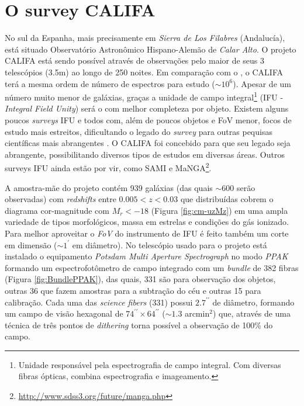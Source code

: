 
\section{O survey CALIFA}
\label{sec:CALePyC:Apresent}

No sul da Espanha, mais precisamente em {\em Sierra de Los Filabres} (Andalucía), está situado Observatório Astronômico
Hispano-Alemão de {\em Calar Alto}. O projeto CALIFA está sendo possível através de observações pelo maior de seus 3
telescópios (3.5m) ao longo de 250 noites. Em comparação com o \SDSS, o CALIFA terá a mesma ordem de número de espectros
para estudo ($\sim 10^6$). Apesar de um número muito menor de galáxias, graças a unidade de campo
integral\footnote{Unidade responsável pela espectrografia de campo integral. Com diversas fibras ópticas, combina
espectrografia e imageamento.} (IFU - {\em Integral Field Unity}) será o com melhor completeza por objeto. Existem
alguns poucos {\em surveys} IFU e todos com, além de poucos objetos e FoV menor, focos de estudo mais estreitos,
dificultando o legado do {\em survey} para outras pequisas científicas mais abrangentes \citep[SAURON;][região central
de 72 galáxias com $z < 0.01$.]{de-Zeeuw2002} \citep[PINGS;][algumas galáxias muito próximas ($\sim 10$ Mpc) e o estudo
atual de 70 (U)LIRGs com $z <0.26$]{RosalesOrtega2010} \citep[VENGA;][$30$ galáxias espirais]{Blanc2010}
\citep[ATLAS\textsuperscript{3D};][260 galáxias {\em early-type} próximas]{Cappellari2011}. O CALIFA foi concebido para
que seu legado seja abrangente, possibilitando diversos tipos de estudos em diversas áreas. Outros surveys IFU ainda
estão por vir, como SAMI \citep{Croom2012} e MaNGA\footnote{\url{http://www.sdss3.org/future/manga.php}}.

A amostra-mãe do projeto contém 939 galáxias (das quais $\sim 600$ serão observadas) com {\em redshifts} entre $0.005 <
z < 0.03$ que distribuídas cobrem o diagrama cor-magnitude com $M_r < -18$ (Figura \ref{fig:cm-uzMz}) em uma ampla
variedade de tipos morfológicos, massa em estrelas e condições do gás ionizado. Para melhor aproveitar o {\em FoV} do
instrumento de IFU é feito também um corte em dimensão ($\sim1^{\prime}$ em diâmetro). No telescópio usado para o
projeto está instalado o equipamento {\em Potsdam Multi Aperture Spectrograph} \citep[PMAS; ][]{Roth2005} no modo
{\em PPAK} \citep{Verheijen2004, Kelz2006} formando um espectrofotômetro de campo integrado com um {\em bundle} de 382
fibras (Figura \ref{fig:BundlePPAK}), das quais, 331 são para observação dos objetos, outras 36 que fazem amostras para a
subtração do céu e outras 15 para calibração. Cada uma das {\em science fibers} (331) possui $2.7^{\prime\prime}$ de
diâmetro, formando um campo de visão hexagonal de $74^{\prime\prime} \times 64^{\prime\prime}$ ($\sim1.3$ arcmin$^2$)
que, através de uma técnica de três pontos de {\em dithering} torna possível a observação de 100\% do campo.

